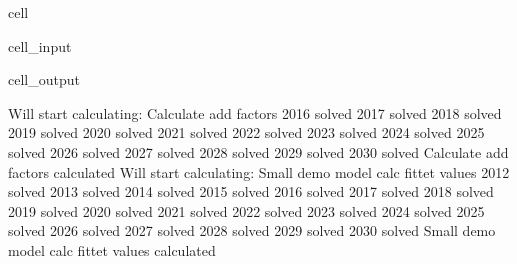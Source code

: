 \documentclass[letterpaper,10pt,english]{jupyterBook}
\begin{document}
\begin{sphinxuseclass}{cell}\begin{sphinxVerbatimInput}

\begin{sphinxuseclass}{cell_input}
\begin{sphinxVerbatim}[commandchars=\\\{\}]
  
  
\end{sphinxVerbatim}

\end{sphinxuseclass}\end{sphinxVerbatimInput}
\begin{sphinxVerbatimOutput}

\begin{sphinxuseclass}{cell_output}
\begin{sphinxVerbatim}[commandchars=\\\{\}]
Will start calculating: Calculate add factors
2016  solved
2017  solved
2018  solved
2019  solved
2020  solved
2021  solved
2022  solved
2023  solved
2024  solved
2025  solved
2026  solved
2027  solved
2028  solved
2029  solved
2030  solved
Calculate add factors calculated 
Will start calculating: Small demo model calc fittet values
2012  solved
2013  solved
2014  solved
2015  solved
2016  solved
2017  solved
2018  solved
2019  solved
2020  solved
2021  solved
2022  solved
2023  solved
2024  solved
2025  solved
2026  solved
2027  solved
2028  solved
2029  solved
2030  solved
Small demo model calc fittet values calculated 
\end{sphinxVerbatim}

\end{sphinxuseclass}\end{sphinxVerbatimOutput}

\end{sphinxuseclass}
\end{document}
